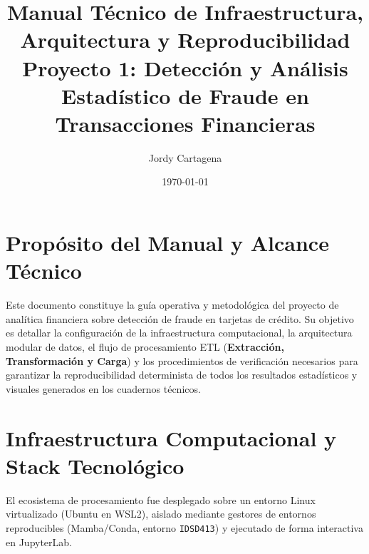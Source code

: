 \documentclass[11pt]{article}
\author{Jordy Cartagena}
\date{\today}
\title{Manual Técnico de Infraestructura, Arquitectura y Reproducibilidad\\\medskip
\large Proyecto 1: Detección y Análisis Estadístico de Fraude en Transacciones Financieras}
\begin{document}
\maketitle
\tableofcontents


\section{Propósito del Manual y Alcance Técnico}
\label{sec:org6eb6cd2}

Este documento constituye la guía operativa y metodológica del proyecto de analítica financiera sobre detección de fraude en tarjetas de crédito. Su objetivo es detallar la configuración de la infraestructura computacional, la arquitectura modular de datos, el flujo de procesamiento ETL (\textbf{Extracción, Transformación y Carga}) y los procedimientos de verificación necesarios para garantizar la reproducibilidad determinista de todos los resultados estadísticos y visuales generados en los cuadernos técnicos.

\section{Infraestructura Computacional y Stack Tecnológico}
\label{sec:org49875e9}

El ecosistema de procesamiento fue desplegado sobre un entorno Linux virtualizado (Ubuntu en WSL2), aislado mediante gestores de entornos reproducibles (Mamba/Conda, entorno \texttt{IDSD413}) y ejecutado de forma interactiva en JupyterLab.
\end{document}

